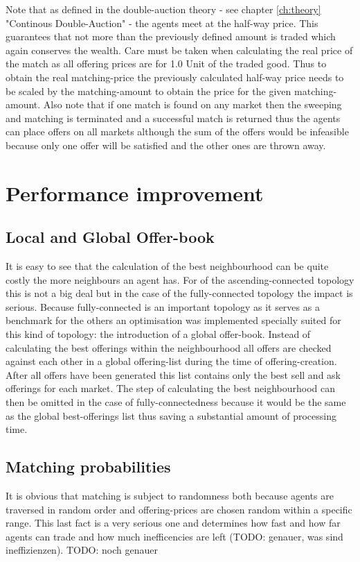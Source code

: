 \documentclass[Bachelorarbeit.tex]{subfiles}
\begin{document}
Note that as defined in the double-auction theory - see chapter \ref{ch:theory} "Continous Double-Auction" - the agents meet at the half-way price. This guarantees that not more than the previously defined amount is traded which again conserves the wealth. Care must be taken when calculating the real price of the match as all offering prices are for 1.0 Unit of the traded good. Thus to obtain the real matching-price the previously calculated half-way price needs to be scaled by the matching-amount to obtain the price for the given matching-amount.
\medskip
Also note that if one match is found on any market then the sweeping and matching is terminated and a successful match is returned thus the agents can place offers on all markets although the sum of the offers would be infeasible because only one offer will be satisfied and the other ones are thrown away.

\section{Performance improvement}
\label{sec:implementation_performanceImprovement}

\subsection{Local and Global Offer-book}
It is easy to see that the calculation of the best neighbourhood can be quite costly the more neighbours an agent has. For of the ascending-connected topology this is not a big deal but in the case of the fully-connected topology the impact is serious. Because fully-connected is an important topology as it serves as a benchmark for the others an optimisation was implemented specially suited for this kind of topology: the introduction of a global offer-book. Instead of calculating the best offerings within the neighbourhood all offers are checked against each other in a global offering-list during the time of offering-creation. After all offers have been generated this list contains only the best sell and ask offerings for each market. The step of calculating the best neighbourhood can then be omitted in the case of fully-connectedness because it would be the same as the global best-offerings list thus saving a substantial amount of processing time.

\subsection{Matching probabilities}
It is obvious that matching is subject to randomness both because agents are traversed in random order and offering-prices are chosen random within a specific range. This last fact is a very serious one and determines how fast and how far agents can trade and how much inefficencies are left (TODO: genauer, was sind ineffizienzen). TODO: noch genauer
\end{document}

